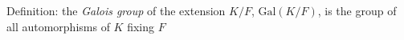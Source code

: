\documentclass[preview]{standalone}
\begin{document}
\begin{center}
Definition: the \textit{Galois group} of the extension $K/F$, $\text{Gal}(K/F)$, is the group of all automorphisms of $K$ fixing $F$
\end{center}
\end{document}
